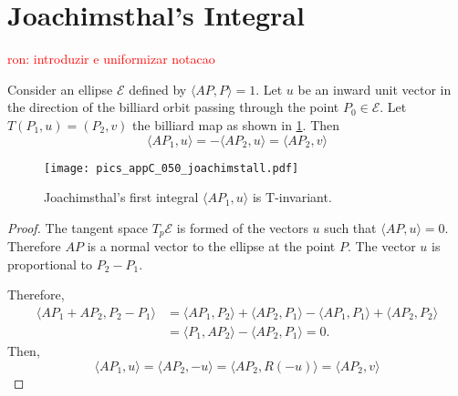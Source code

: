   

\section{Joachimsthal's Integral}

\textcolor{red}{ron: introduzir e uniformizar notacao}


\begin{proposition}\label{prop:invariant_joachim} Consider an ellipse $\mathcal{E}$ defined by $\langle A P,P\rangle=1$. Let $u$ be an inward unit vector in the direction of the billiard orbit passing through the point $P_0\in\mathcal{E} $. Let $T(P_1,u)=(P_2,v)$ the billiard map as shown in   \cref{fig:appC-joachim}.
	Then 
	\[  \langle A P_1,u\rangle =  -\langle A P_2,u\rangle=  \langle A P_2,v\rangle  \]
	
	\end{proposition}

\begin{figure}[H]
	\begin{center}
	 \texttt{[image: pics\_appC\_050\_joachimstall.pdf]}
		\caption {Joachimsthal's first integral  $\langle AP_1,u\rangle $ is T-invariant.}
		 \label{fig:appC-joachim}
	\end{center}
\end{figure}

\begin{proof} The tangent space  $T_{p}\mathcal{E}$ is formed of the vectors $u$ such that $ \langle A P,u\rangle =0.$ Therefore $AP$ is a normal vector to the ellipse at the point $P$. The vector $u$ is proportional to $P_2-P_1$.
	
	Therefore,
	\begin{align*}  \langle AP_1+AP_2 , P_2-P_1\rangle &= \langle AP_1  , P_2 \rangle + \langle AP_2  , P_1 \rangle  - \langle AP_1  , P_1 \rangle + \langle AP_2  , P_2 \rangle \\
	&= \langle  P_1  , AP_2 \rangle - \langle AP_2  , P_1 \rangle =0. 
	\end{align*}
	Then,
	\[ \langle AP_1 , u\rangle =\langle  AP_2 ,-u\rangle  =  \langle  AP_2 ,R(-u)\rangle  =  \langle  AP_2, v\rangle \]
	\end{proof}